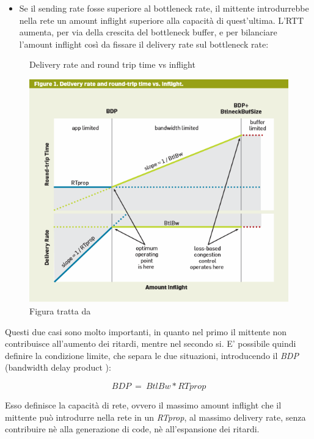 \begin{itemize}

\item Se il sending rate fosse superiore al bottleneck rate, il mittente introdurrebbe nella rete un amount inflight superiore alla capacità di quest'ultima. L'RTT aumenta, per via della crescita del bottleneck buffer, e per bilanciare l'amount inflight così da fissare il delivery rate sul bottleneck rate:

\end{itemize}

\begin{figure}[H]

\center
\caption{Delivery rate and round trip time vs inflight}
\label{Delivery_rate_round_trip_time}
\includegraphics[scale=0.8]{chapters/failed/img/Delivery_rate_round_trip_time}
\caption*{Figura tratta da \cite[p.~60]{Cardwell:2017:BCC:3042068.3009824}}

\end{figure}

Questi due casi sono molto importanti, in quanto nel primo il mittente non contribuisce all'aumento dei ritardi, mentre nel secondo si. E' possibile quindi definire la condizione limite, che separa le due situazioni, introducendo il \textit{BDP} (bandwidth delay product \cite[p.~59]{Cardwell:2017:BCC:3042068.3009824}):

\[ BDP \:=\: BtlBw * RTprop \]

Esso definisce la capacità di rete, ovvero il massimo amount inflight che il mittente può introdurre nella rete in un \textit{RTprop}, al massimo delivery rate, senza contribuire nè alla generazione di code, nè all'espansione dei ritardi. \bigskip

